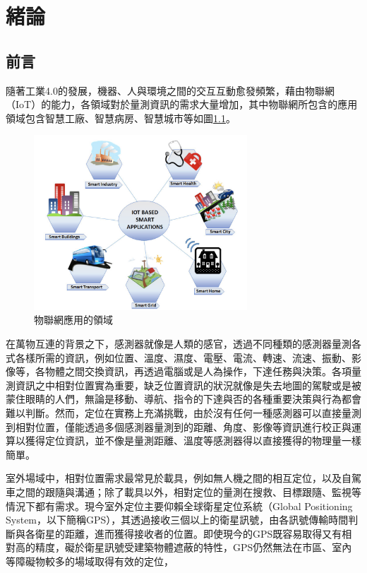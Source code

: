 \chapter{緒論}


\section{前言} %

隨著工業4.0的發展，機器、人與環境之間的交互互動愈發頻繁，藉由物聯網（IoT）的能力，各領域對於量測資訊的需求大量增加，其中物聯網所包含的應用領域包含智慧工廠、智慧病房、智慧城市等如圖\ref{pic:iot}\cite{iot}。

\begin{figure}[ht]
    \centering
    \includegraphics[width=8cm]{ch1pic/iot.png}
    \caption{物聯網應用的領域\cite{iot}}
    \label{pic:iot}
\end{figure}

在萬物互連的背景之下，感測器就像是人類的感官，透過不同種類的感測器量測各式各樣所需的資訊，例如位置、溫度、濕度、電壓、電流、轉速、流速、振動、影像等，各物體之間交換資訊，再透過電腦或是人為操作，下達任務與決策。各項量測資訊之中相對位置實為重要，缺乏位置資訊的狀況就像是失去地圖的駕駛或是被蒙住眼睛的人們，無論是移動、導航、指令的下達與否的各種重要決策與行為都會難以判斷。然而，定位在實務上充滿挑戰，由於沒有任何一種感測器可以直接量測到相對位置，僅能透過多個感測器量測到的距離、角度、影像等資訊進行校正與運算以獲得定位資訊，並不像是量測距離、溫度等感測器得以直接獲得的物理量一樣簡單。



室外場域中，相對位置需求最常見於載具，例如無人機之間的相互定位，以及自駕車之間的跟隨與溝通；除了載具以外，相對定位的量測在搜救、目標跟隨、監視等情況下都有需求\cite{outdoor_scenario}。現今室外定位主要仰賴全球衛星定位系統（Global Positioning System，以下簡稱GPS）\cite{GPS_important}，其透過接收三個以上的衛星訊號，由各訊號傳輸時間判斷與各衛星的距離，進而獲得接收者的位置。即使現今的GPS既容易取得又有相對高的精度\cite{survey_light2020}，礙於衛星訊號受建築物體遮蔽的特性，GPS仍然無法在市區、室內等障礙物較多的場域取得有效的定位\cite{survey_light2018}，

